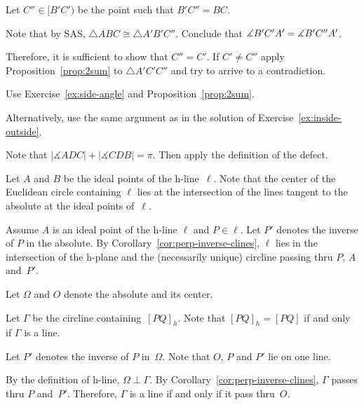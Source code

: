 Let $C''\in [B'C')$ be the point such that $B'C''=BC$.

Note that by SAS, $\triangle ABC\cong \triangle A'B'C''$.
Conclude that $\measuredangle B'C'A'\z= \measuredangle B'C''A'$.

Therefore, it is sufficient to show that $C''=C'$.
If $C'\ne C''$ apply Proposition~\ref{prop:2sum} to $\triangle A'C'C''$ and try to arrive to a contradiction.


Use Exercise~\ref{ex:side-angle} and Proposition~\ref{prop:2sum}.

Alternatively, use the same argument as in the solution of Exercise~\ref{ex:inside-outside}.

Note that 
$|\measuredangle ADC|+|\measuredangle CDB|=\pi$.
Then apply the definition of the defect.

\setcounter{eqtn}{0}

Let $A$ and $B$ be the ideal points of the h-line~$\ell$. 
Note that the center of the Euclidean circle containing $\ell$ lies 
at the intersection of the lines tangent to the absolute at the ideal points of~$\ell$.

Assume $A$ is an ideal point of the h-line $\ell$
and $P\in \ell$.
Let $P'$ denotes the inverse of $P$ in the absolute.
By Corollary~\ref{cor:perp-inverse-clines},
$\ell$ lies in the intersection of the h-plane and the (necessarily unique) circline 
passing thru $P$, $A$ and~$P'$.

Let $\Omega$ and $O$ denote the absolute and its center. 

Let $\Gamma$ be the circline containing~$[PQ]_h$.
Note that $[PQ]_h=[PQ]$ if and only if $\Gamma$ is a line.

Let $P'$ denotes the inverse of $P$ in~$\Omega$.
Note that $O$, $P$ and $P'$ lie on one line.

By the definition of h-line, $\Omega\perp \Gamma$.
By Corollary~\ref{cor:perp-inverse-clines}, $\Gamma$ passes thru $P$ and~$P'$. 
Therefore, $\Gamma$
is a line if and only if it pass thru~$O$.

